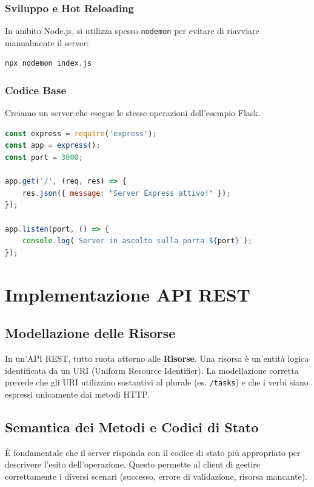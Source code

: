 \documentclass[11pt,a4paper]{report}
\begin{document}
\subsection{Sviluppo e Hot Reloading}
In ambito Node.js, si utilizza spesso \texttt{nodemon} per evitare di riavviare manualmente il server:
\begin{lstlisting}[language=bash]
npx nodemon index.js
\end{lstlisting}

\subsection{Codice Base}
Creiamo un server che esegue le stesse operazioni dell'esempio Flask.

\begin{lstlisting}[language=javascript, caption=index.js (Express)]
const express = require('express');
const app = express();
const port = 3000;

app.get('/', (req, res) => {
    res.json({ message: "Server Express attivo!" });
});

app.listen(port, () => {
    console.log(`Server in ascolto sulla porta ${port}`);
});
\end{lstlisting}

\chapter{Implementazione API REST}

\section{Modellazione delle Risorse}
In un'API REST, tutto ruota attorno alle \textbf{Risorse}. Una risorsa è un'entità logica identificata da un URI (Uniform Resource Identifier). La modellazione corretta prevede che gli URI utilizzino sostantivi al plurale (es. \texttt{/tasks}) e che i verbi siano espressi unicamente dai metodi HTTP.

\section{Semantica dei Metodi e Codici di Stato}
\`E fondamentale che il server risponda con il codice di stato più appropriato per descrivere l'esito dell'operazione. Questo permette al client di gestire correttamente i diversi scenari (successo, errore di validazione, risorsa mancante).
\end{document}
